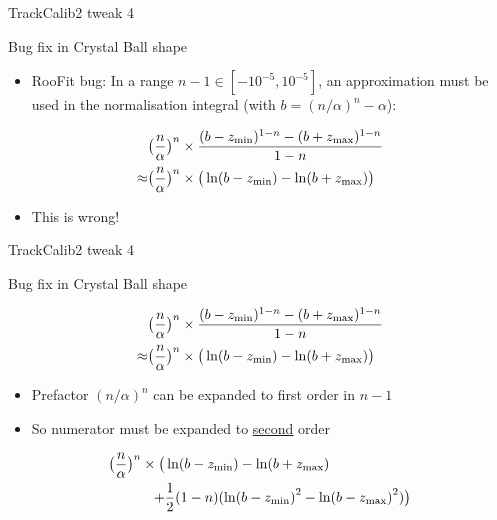\documentclass[xcolor={dvipsnames}]{beamer}
\begin{document}
\begin{frame}{TrackCalib2 tweak 4}
  \vspace{0.0cm}
  \begin{center}
    {\large Bug fix in Crystal Ball shape}
  \end{center}
  \vspace{0.5cm}
  \begin{itemize}
    \setlength\itemsep{1.0em}
    \item{RooFit bug: In a range $n - 1 \in [-10^{-5}, 10^{-5}]$, an approximation must be used in the normalisation integral (with $b = (n/\alpha)^n - \alpha$):}
  \end{itemize}
  \begin{align*}
    &\big(\frac{n}{\alpha}\big)^n\times\frac{(b - z_{\rm min})^{1 - n} - (b + z_{\rm max})^{1 - n}}{1 - n} \\
    \approx &\big(\frac{n}{\alpha}\big)^n\times\big(\ln(b - z_{\rm min}) - \ln(b + z_{\rm max})\big)
  \end{align*}
  \begin{itemize}
    \setlength\itemsep{1.0em}
    \item{This is wrong!}
  \end{itemize}
\end{frame}

\begin{frame}{TrackCalib2 tweak 4}
  \vspace{0.0cm}
  \begin{center}
    {\large Bug fix in Crystal Ball shape}
  \end{center}
  \vspace{0.5cm}
  \begin{align*}
    &\big(\frac{n}{\alpha}\big)^n\times\frac{(b - z_{\rm min})^{1 - n} - (b + z_{\rm max})^{1 - n}}{1 - n} \\
    \approx &\big(\frac{n}{\alpha}\big)^n\times\big(\ln(b - z_{\rm min}) - \ln(b + z_{\rm max})\big)
  \end{align*}
  \begin{itemize}
    \setlength\itemsep{1.0em}
    \item{Prefactor $(n/\alpha)^n$ can be expanded to first order in $n - 1$}
    \item{So numerator must be expanded to \underline{second} order}
  \end{itemize}
  \begin{align*}
    \big(\frac{n}{\alpha}\big)^n\times\big(&\ln(b - z_{\rm min}) - \ln(b + z_{\rm max}) \\
    + &\frac{1}{2}(1 - n)(\ln(b - z_{\rm min})^2 - \ln(b - z_{\rm max})^2)\big)
  \end{align*}
\end{frame}
\end{document}
